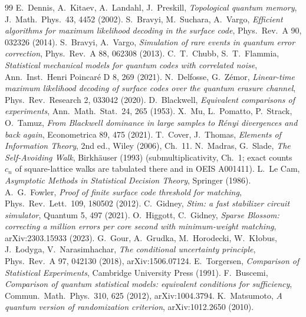 \documentclass[a4paper,11pt]{article}
\theoremstyle{plain}
\theoremstyle{definition}
\theoremstyle{remark}
\begin{document}
\begin{thebibliography}{99}
 E.~Dennis, A.~Kitaev, A.~Landahl, J.~Preskill, \emph{Topological quantum memory}, J.\ Math.\ Phys.\ 43, 4452 (2002).
 S.~Bravyi, M.~Suchara, A.~Vargo, \emph{Efficient algorithms for maximum likelihood decoding in the surface code}, Phys.\ Rev.\ A 90, 032326 (2014).
 S.~Bravyi, A.~Vargo, \emph{Simulation of rare events in quantum error correction}, Phys.\ Rev.\ A 88, 062308 (2013).
 C.~T.~Chubb, S.~T.~Flammia, \emph{Statistical mechanical models for quantum codes with correlated noise}, Ann.\ Inst.\ Henri Poincar\'e D 8, 269 (2021).
 N.~Delfosse, G.~Z\'emor, \emph{Linear-time maximum likelihood decoding of surface codes over the quantum erasure channel}, Phys.\ Rev.\ Research 2, 033042 (2020).
 D.~Blackwell, \emph{Equivalent comparisons of experiments}, Ann.\ Math.\ Stat.\ 24, 265 (1953).
 X.~Mu, L.~Pomatto, P.~Strack, O.~Tamuz, \emph{From Blackwell dominance in large samples to R\'enyi divergences and back again}, Econometrica 89, 475 (2021).
 T.~Cover, J.~Thomas, \emph{Elements of Information Theory}, 2nd ed., Wiley (2006), Ch.~11.
 N.~Madras, G.~Slade, \emph{The Self-Avoiding Walk}, Birkh\"auser (1993) (submultiplicativity, Ch.~1; exact counts $c_n$ of square-lattice walks are tabulated there and in OEIS A001411).
 L.~Le Cam, \emph{Asymptotic Methods in Statistical Decision Theory}, Springer (1986).
 A.~G.~Fowler, \emph{Proof of finite surface code threshold for matching}, Phys.\ Rev.\ Lett.\ 109, 180502 (2012).
 C.~Gidney, \emph{Stim: a fast stabilizer circuit simulator}, Quantum 5, 497 (2021).
 O.~Higgott, C.~Gidney, \emph{Sparse Blossom: correcting a million errors per core second with minimum-weight matching}, arXiv:2303.15933 (2023).
 G.~Gour, A.~Grudka, M.~Horodecki, W.~K\l{}obus, J.~\L{}odyga, V.~Narasimhachar, \emph{The conditional uncertainty principle}, Phys.\ Rev.\ A 97, 042130 (2018), arXiv:1506.07124.
 E.~Torgersen, \emph{Comparison of Statistical Experiments}, Cambridge University Press (1991).
 F.~Buscemi, \emph{Comparison of quantum statistical models: equivalent conditions for sufficiency}, Commun.\ Math.\ Phys.\ 310, 625 (2012), arXiv:1004.3794.
 K.~Matsumoto, \emph{A quantum version of randomization criterion}, arXiv:1012.2650 (2010).

\end{thebibliography}
\end{document}
